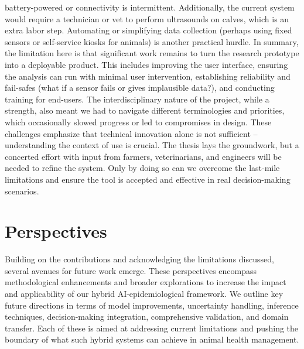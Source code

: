 battery-powered or connectivity is intermittent. Additionally, the current system would require a technician or vet to perform ultrasounds on calves, which is an extra labor step. Automating or simplifying data collection (perhaps using fixed sensors or self-service kiosks for animals) is another practical hurdle. In summary, the limitation here is that significant work remains to turn the research prototype into a deployable product. This includes improving the user interface, ensuring the analysis can run with minimal user intervention, establishing reliability and fail-safes (what if a sensor fails or gives implausible data?), and conducting training for end-users. The interdisciplinary nature of the project, while a strength, also meant we had to navigate different terminologies and priorities, which occasionally slowed progress or led to compromises in design. These challenges emphasize that technical innovation alone is not sufficient – understanding the context of use is crucial. The thesis lays the groundwork, but a concerted effort with input from farmers, veterinarians, and engineers will be needed to refine the system. Only by doing so can we overcome the last-mile limitations and ensure the tool is accepted and effective in real decision-making scenarios.



\section{Perspectives}

Building on the contributions and acknowledging the limitations discussed, several avenues for future work emerge. These perspectives encompass methodological enhancements and broader explorations to increase the impact and applicability of our hybrid AI-epidemiological framework. We outline key future directions in terms of model improvements, uncertainty handling, inference techniques, decision-making integration, comprehensive validation, and domain transfer. Each of these is aimed at addressing current limitations and pushing the boundary of what such hybrid systems can achieve in animal health management.


